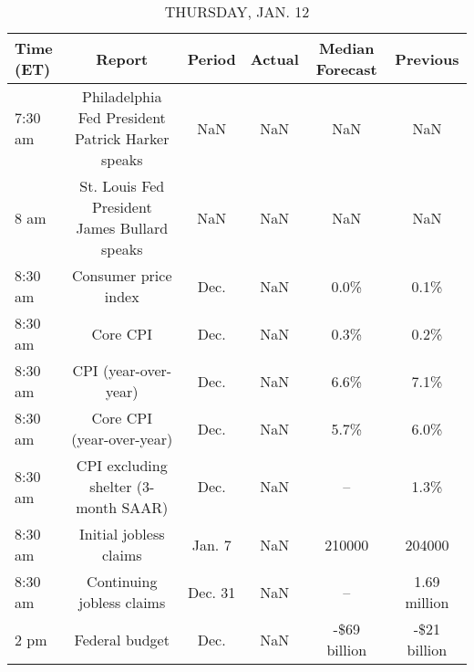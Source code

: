 \documentclass{article}%
\begin{document}
%


\begin{table}[htbp]%
\caption{THURSDAY, JAN. 12}%
\centering%
\begin{adjustbox}{width=1\textwidth}%
\begin{tabular}{lccccc}
\toprule
Time (ET) &                                           Report &  Period & Actual & Median Forecast &     Previous \\
\midrule
  7:30 am & Philadelphia Fed President Patrick Harker speaks &     NaN &    NaN &             NaN &          NaN \\
     8 am &     St. Louis Fed President James Bullard speaks &     NaN &    NaN &             NaN &          NaN \\
  8:30 am &                             Consumer price index &    Dec. &    NaN &            0.0\% &         0.1\% \\
  8:30 am &                                         Core CPI &    Dec. &    NaN &            0.3\% &         0.2\% \\
  8:30 am &                             CPI (year-over-year) &    Dec. &    NaN &            6.6\% &         7.1\% \\
  8:30 am &                        Core CPI (year-over-year) &    Dec. &    NaN &            5.7\% &         6.0\% \\
  8:30 am &             CPI excluding shelter (3-month SAAR) &    Dec. &    NaN &              -- &         1.3\% \\
  8:30 am &                           Initial jobless claims &  Jan. 7 &    NaN &          210000 &       204000 \\
  8:30 am &                        Continuing jobless claims & Dec. 31 &    NaN &              -- & 1.69 million \\
     2 pm &                                   Federal budget &    Dec. &    NaN &    -\$69 billion & -\$21 billion \\
\bottomrule
\end{tabular}
%
\end{adjustbox}%
\end{table}

%
\end{document}
